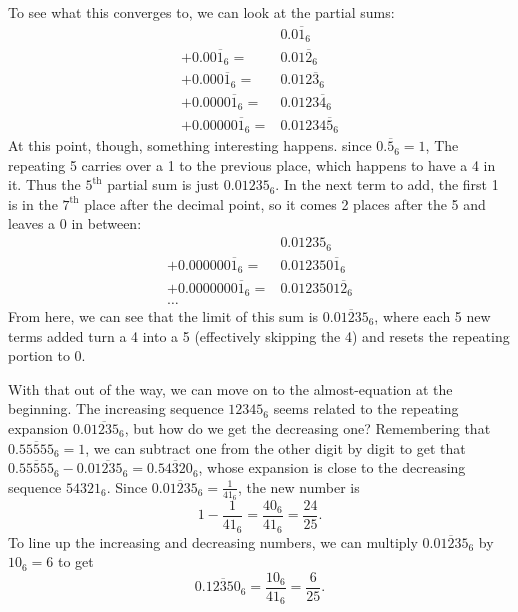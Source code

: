 \documentclass{article}
\begin{document}
To see what this converges to, we can look at the partial sums:
\begin{align*}
  & 0.0\overline{1}_6 \\
  + 0.00\overline{1}_6 =& 0.01\overline{2}_6 \\
  + 0.000\overline{1}_6 =& 0.012\overline{3}_6 \\
  + 0.0000\overline{1}_6 =& 0.0123\overline{4}_6 \\
  + 0.00000\overline{1}_6 =& 0.01234\overline{5}_6
\end{align*}
At this point, though, something interesting happens.
since $0.\overline{5}_6=1$,
The repeating 5 carries over a 1 to the previous place,
which happens to have a 4 in it.
Thus the $5^\text{th}$ partial sum is just $0.01235_6$.
In the next term to add,
the first 1 is in the $7^\text{th}$ place after the decimal point,
so it comes 2 places after the 5 and leaves a 0 in between:
\begin{align*}
  & 0.01235_6 \\
  + 0.000000\overline{1}_6 =& 0.012350\overline{1}_6 \\
  + 0.0000000\overline{1}_6 =& 0.0123501\overline{2}_6 \\
  \ldots &
\end{align*}
From here, we can see that the limit of this sum is
$0.\overline{01235}_6$,
where each 5 new terms added turn a 4 into a 5
(effectively skipping the 4)
and resets the repeating portion to 0.

With that out of the way, we can move on to the almost-equation at the beginning.
The increasing sequence $12345_6$ seems related to the repeating expansion $0.\overline{01235_6}$,
but how do we get the decreasing one?
Remembering that $0.\overline{55555}_6=1$,
we can subtract one from the other digit by digit
to get that $0.\overline{55555}_6-0.\overline{01235_6}=0.\overline{54320}_6$,
whose expansion is close to the decreasing sequence $54321_6$.
Since $0.\overline{01235}_6=\frac{1}{41_6}$,
the new number is
\[1-\frac{1}{41_6}=\frac{40_6}{41_6}=\frac{24}{25}.\]
To line up the increasing and decreasing numbers,
we can multiply $0.\overline{01235}_6$ by $10_6=6$
to get
\[0.\overline{12350}_6 = \frac{10_6}{41_6} = \frac{6}{25}.\]
\end{document}
